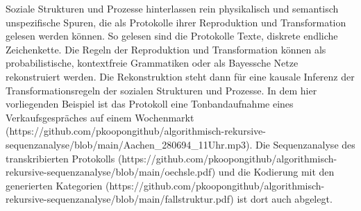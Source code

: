 \documentclass[12pt]{article}
\begin{document}
Soziale Strukturen und Prozesse hinterlassen rein physikalisch und semantisch unspezifische Spuren, die als Protokolle ihrer Reproduktion und Transformation gelesen werden können. So gelesen sind die Protokolle Texte, diskrete endliche Zeichenkette. Die Regeln der Reproduktion und Transformation können als probabilistische, kontextfreie Grammatiken oder als Bayessche Netze rekonstruiert werden. Die Rekonstruktion steht dann für eine kausale Inferenz der Transformationsregeln der sozialen Strukturen und Prozesse. In dem hier vorliegenden Beispiel ist das Protokoll eine Tonbandaufnahme eines Verkaufsgespräches auf einem Wochenmarkt (https://github.com/pkoopongithub/algorithmisch-rekursive-sequenzanalyse/blob/main/Aachen_280694_11Uhr.mp3). Die Sequenzanalyse des transkribierten Protokolls (https://github.com/pkoopongithub/algorithmisch-rekursive-sequenzanalyse/blob/main/oechsle.pdf) und die Kodierung mit den generierten Kategorien (https://github.com/pkoopongithub/algorithmisch-rekursive-sequenzanalyse/blob/main/fallstruktur.pdf) ist dort auch abgelegt.
\end{document}
